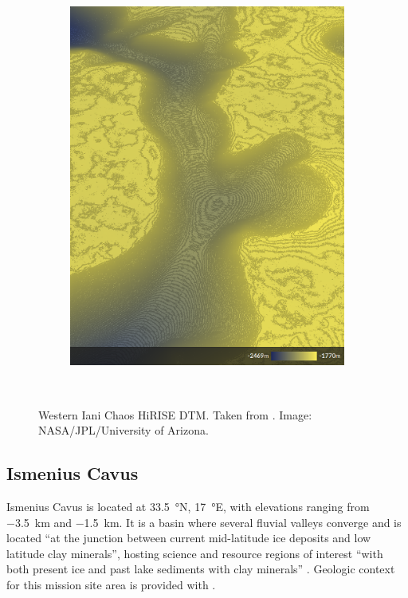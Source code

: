 \begin{figure}[h]
\begin{subfigure}[t]{\subfigureWidth}
        \includegraphics[height=\graphicsHeight]{sections/mars-solar-energy/mission-sites/images/western-iani-chaos-dtm-altimetry.png}
		\label{fig:sub:western-iani-chaos-dtm-altimetry}
	\end{subfigure}\\[0.8ex]
    \caption[Western Iani Chaos HiRISE digital terrain model]
            {Western Iani Chaos \ac{HiRISE} \ac{DTM}. Taken from . Image: \ac{NASA}/\ac{JPL}/University of Arizona.}
    \label{fig:western-iani-chaos}
\vspace{-2ex}
\end{figure}

\clearpage
\subsection{Ismenius Cavus}
\label{sec:MissionSites:IsmeniusCavus}
Ismenius Cavus is located at \SI{33.5}{\degree}N, \SI{17}{\degree}E, with elevations ranging from \SI{-3.5}{\kilo\meter} and \SI{-1.5}{\kilo\meter}. It is a basin where several fluvial valleys converge and is located ``at the junction between current mid-latitude ice deposits and low latitude clay minerals'', hosting science and resource regions of interest ``with both present ice and past lake sediments with clay minerals''  . Geologic context for this mission site area is provided with .

